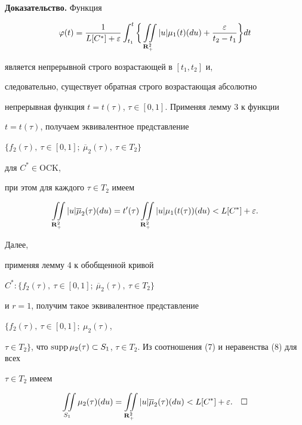 {\bf Доказательство.} Функция


$$


\varphi


(t)=\frac{1}{L[C^*]+\varepsilon} \int_{t_1}^{t} \bigg\{


\iint\limits_{{\bold R}^2_+}


|u|\mu_1(t)(du)+\frac{\varepsilon}{t_2-t_1}\bigg\}dt


$$


является непрерывной строго возрастающей в $[t_1,t_2]$ и,


следовательно, существует обратная строго возрастающая абсолютно


непрерывная функция $t=t(\tau)$, $\tau\in[0,1]$. Применяя лемму 3 к функции


$t=t(\tau)$, получаем эквивалентное представление


$\{f_2(\tau),\ \tau\in[0,1];\ \overline{\mu}_2(\tau),\ \tau\in T_2\}$


для $C^*\in \mathrm{OCK}$,


при этом для каждого $\tau\in T_2$ имеем


\begin{equation}


\iint\limits_{{\bold


R}^2_+} |u|\overline{\mu}_2(\tau)(du)=t'(\tau) \iint\limits_{{\bold


R}^2_+} |u|\mu_1(t(\tau))(du)<L[C^*]+\varepsilon.


\end{equation}


Далее,


применяя лемму 4 к обобщенной кривой


$C^*:\{f_2(\tau),\ \tau\in[0,1];\ \overline{\mu}_2(\tau),\ \tau\in T_2\}$


и $r=1$, получим такое эквивалентное представление


$\{f_2(\tau),\ \tau\in[0,1];\ \mu_2(\tau)$,


$\tau\in T_2\}$, что $\supp\mu_2(\tau)


\subset S_1$, $\tau\in T_2$. Из соотношения (7) и неравенства (8) для всех


$\tau\in T_2$ имеем


$$


\iint\limits_{S_1}\mu_2(\tau)(du)=


\iint\limits_{{\bold R}^2_+}


|u|\overline{\mu}_2(\tau)(du)<L[C^*]+\varepsilon.\quad\square


$$





